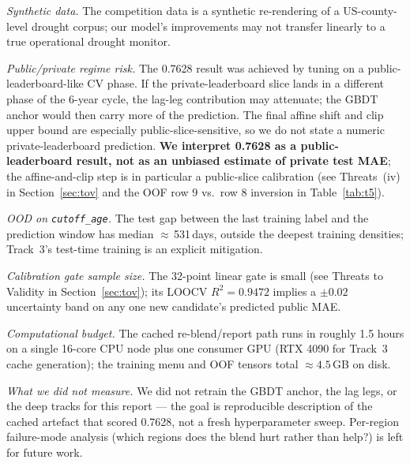 \documentclass[conference,10pt,a4paper]{IEEEtran}
\begin{document}
\emph{Synthetic data.} The competition data is a synthetic re-rendering of a US-county-level drought corpus; our model's improvements may not transfer linearly to a true operational drought monitor.

\emph{Public/private regime risk.} The 0.7628 result was achieved by tuning on a public-leaderboard-like CV phase. If the private-leaderboard slice lands in a different phase of the 6-year cycle, the lag-leg contribution may attenuate; the GBDT anchor would then carry more of the prediction. The final affine shift and clip upper bound are especially public-slice-sensitive, so we do not state a numeric private-leaderboard prediction. \textbf{We interpret 0.7628 as a public-leaderboard result, not as an unbiased estimate of private test MAE}; the affine-and-clip step is in particular a public-slice calibration (see Threats~(iv) in Section~\ref{sec:tov} and the OOF row 9 vs.\ row 8 inversion in Table~\ref{tab:t5}).

\emph{OOD on \texttt{cutoff\_age}.} The test gap between the last training label and the prediction window has median $\approx$\,531\,days, outside the deepest training densities; Track~3's test-time training is an explicit mitigation.

\emph{Calibration gate sample size.} The 32-point linear gate is small (see Threats to Validity in Section~\ref{sec:tov}); its LOOCV $R^2 = 0.9472$ implies a $\pm 0.02$ uncertainty band on any one new candidate's predicted public MAE.

\emph{Computational budget.} The cached re-blend/report path runs in roughly 1.5 hours on a single 16-core CPU node plus one consumer GPU (RTX 4090 for Track~3 cache generation); the training menu and OOF tensors total $\approx 4.5$\,GB on disk.

\emph{What we did not measure.} We did not retrain the GBDT anchor, the lag legs, or the deep tracks for this report --- the goal is reproducible description of the cached artefact that scored 0.7628, not a fresh hyperparameter sweep. Per-region failure-mode analysis (which regions does the blend hurt rather than help?) is left for future work.
\end{document}
